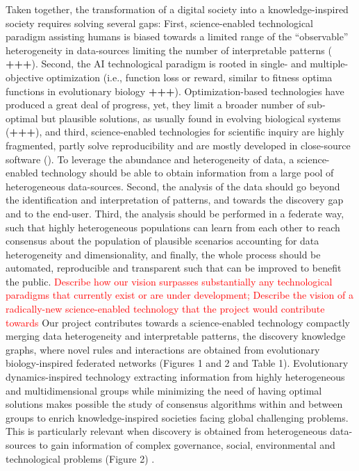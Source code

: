 \documentclass[11pt, a4paper]{article} %
\begin{document}
Taken together, the transformation of a digital society into a
knowledge-inspired society requires solving several gaps: First,
science-enabled technological paradigm assisting humans is biased
towards a limited range of the ``observable'' heterogeneity in
data-sources limiting the number of interpretable patterns ({\bf
  +++}). Second, the AI technological paradigm is rooted in single-
and multiple-objective optimization (i.e., function loss or reward,
similar to fitness optima functions in evolutionary biology {\bf
  +++}). Optimization-based technologies have produced a great deal of
progress, yet, they limit a broader number of sub-optimal but
plausible solutions, as usually found in evolving biological systems
({\bf +++}), and third, science-enabled technologies for scientific
inquiry are highly fragmented, partly solve reproducibility and are
mostly developed in close-source software
(\citep{Inhaber1977,Ioannidis2005,Fang2011,Gunther2018,Hardwicke2018,Mehrabi2019,Real2020}). To
leverage the abundance and heterogeneity of data, a science-enabled
technology should be able to obtain information from a large pool of
heterogeneous data-sources. Second, the analysis of the data should go
beyond the identification and interpretation of patterns, and towards
the discovery gap and to the end-user. Third, the analysis should be
performed in a federate way, such that highly heterogeneous
populations can learn from each other to reach consensus about the
population of plausible scenarios accounting for data heterogeneity
and dimensionality, and finally, the whole process should be
automated, reproducible and transparent such that can be improved to
benefit the public. \textcolor{red}{Describe how our vision surpasses
  substantially any technological paradigms that currently exist or
  are under development; Describe the vision of a radically-new
  science-enabled technology that the project would contribute
  towards} Our project contributes towards a science-enabled
technology compactly merging data heterogeneity and interpretable
patterns, the discovery knowledge graphs, where novel rules and
interactions are obtained from evolutionary biology-inspired federated
networks (Figures 1 and 2 and Table 1). Evolutionary dynamics-inspired
technology extracting information from highly heterogeneous and
multidimensional groups while minimizing the need of having optimal
solutions makes possible the study of consensus algorithms within and
between groups to enrich knowledge-inspired societies facing global
challenging problems. This is particularly relevant when discovery is
obtained from heterogeneous data-sources to gain information of
complex governance, social, environmental and technological problems
(Figure 2) \citep{Mastrangelo2019}.
\end{document}
